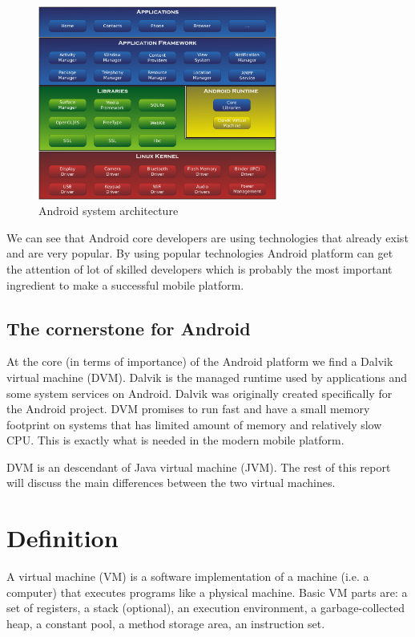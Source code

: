 \documentclass[11pt, oneside]{article}   	%
\begin{document}
\begin{figure}
  \center
  \includegraphics[width=0.7\textwidth]{./images/android_system_architecture.pdf}
  \caption{Android system architecture}
  \label{fig:figure1}
  \end{figure}

We can see that Android core developers are using technologies that already exist and are very popular. By using popular technologies Android platform can get the attention of lot of skilled developers which is probably the most important ingredient to make a successful mobile platform. 

\subsection*{The cornerstone for Android}

At the core (in terms of importance) of the Android platform we find a Dalvik virtual machine (DVM). Dalvik is the managed runtime used by applications and some system services on Android. Dalvik was originally created specifically for the Android project\cite{website:dalviktechnical}. DVM promises to run fast and have a small memory footprint on systems that has limited amount of memory and relatively slow CPU. This is exactly what is needed in the modern mobile platform.

DVM is an descendant of Java virtual machine (JVM). The rest of this report will discuss the main differences between the two virtual machines.

\section{Definition}

A virtual machine (VM) is a software implementation of a machine (i.e. a computer) that executes programs like a physical machine\cite{website:understandingjvminternals}. Basic VM parts are: a set of registers, a stack (optional), an execution environment, a garbage-collected heap, a constant pool, a method storage area, an instruction set.
\end{document}
